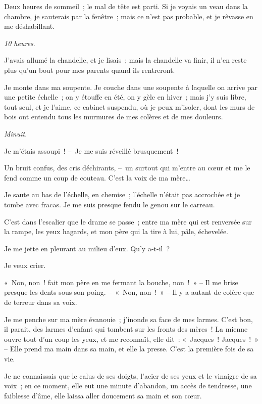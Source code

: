 \documentclass[french,twoside]{book} %
\begin{document}
Deux heures de sommeil ; le mal de tête est parti. Si je voyais un veau dans la chambre, je sauterais par la fenêtre ; mais ce n’est pas probable, et je rêvasse en me déshabillant.\par
\bigbreak
\noindent \emph{10 heures}.\par
J’avais allumé la chandelle, et je lisais ; mais la chandelle va finir, il n’en reste plus qu’un bout pour mes parents quand ils rentreront.\par
Je monte dans ma soupente. Je couche dans une soupente à laquelle on arrive par une petite échelle ; on y étouffe en été, on y gèle en hiver ; mais j’y suis libre, tout seul, et je l’aime, ce cabinet suspendu, où je peux m’isoler, dont les murs de bois ont entendu tous les murmures de mes colères et de mes douleurs.\par
\bigbreak
\noindent \emph{Minuit}.\par
Je m’étais assoupi ! – Je me suis réveillé brusquement !\par
Un bruit confus, des cris déchirants, – un surtout qui m’entre au cœur et me le fend comme un coup de couteau. C’est la voix de ma mère…\par
Je saute au bas de l’échelle, en chemise ; l’échelle n’était pas accrochée et je tombe avec fracas. Je me suis presque fendu le genou sur le carreau.\par
C’est dans l’escalier que le drame se passe ; entre ma mère qui est renversée sur la rampe, les yeux hagards, et mon père qui la tire à lui, pâle, échevelée.\par
Je me jette en pleurant au milieu d’eux. Qu’y a-t-il ?\par
Je veux crier.\par
« Non, non ! fait mon père en me fermant la bouche, non ! » – Il me brise presque les dents sous son poing. – « Non, non ! » – Il y a autant de colère que de terreur dans sa voix.\par
Je me penche sur ma mère évanouie ; j’inonde sa face de mes larmes. C’est bon, il parait, des larmes d’enfant qui tombent sur les fronts des mères ! La mienne ouvre tout d’un coup les yeux, et me reconnaît, elle dit : « Jacques ! Jacques ! » – Elle prend ma main dans sa main, et elle la presse. C’est la première fois de sa vie.\par
Je ne connaissais que le calus de ses doigts, l’acier de ses yeux et le vinaigre de sa voix ; en ce moment, elle eut une minute d’abandon, un accès de tendresse, une faiblesse d’âme, elle laissa aller doucement sa main et son cœur.\par
\end{document}
